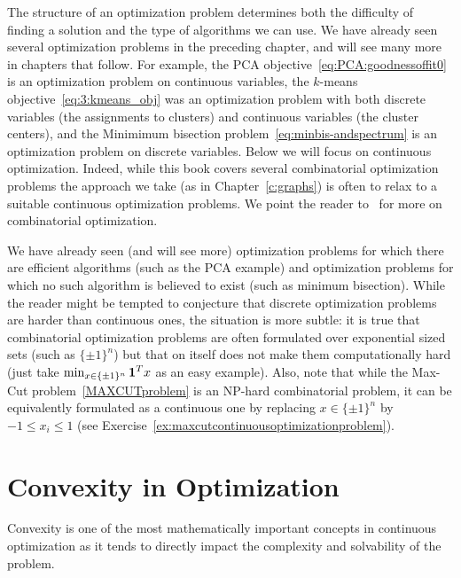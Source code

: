 The structure of an optimization problem determines both the difficulty of finding a solution and the type of algorithms we can use. We have already seen several optimization problems in the preceding chapter, and will see many more in chapters that follow. For example, the PCA objective~\eqref{eq:PCA:goodnessoffit0} is an optimization problem on continuous variables, the $k$-means objective~\eqref{eq:3:kmeans_obj} was an optimization problem with both discrete variables (the assignments to clusters) and continuous variables (the cluster centers), and the Minimimum bisection problem~\eqref{eq:minbis-andspectrum} is an optimization problem on discrete variables. Below we will focus on continuous optimization. Indeed, while this book covers several combinatorial optimization problems the approach we take (as in Chapter~\ref{c:graphs}) is often to relax to a suitable continuous optimization problems. We point the reader to~\cite{wolsey1999integer,schrijver2003combinatorial} for more on combinatorial optimization.

We have already seen (and will see more) optimization problems for which there are efficient algorithms (such as the PCA example) and optimization problems for which no such algorithm is believed to exist (such as minimum bisection). While the reader might be tempted to conjecture that discrete optimization problems are harder than continuous ones, the situation is more subtle: it is true that combinatorial optimization problems are often formulated over exponential sized sets (such as $\{\pm1\}^n$) but that on itself does not make them computationally hard (just take $\min_{x\in\{\pm1\}^n} \mathbf{1}^Tx$ as an easy example). Also, note that while the Max-Cut problem~\eqref{MAXCUTproblem} is an NP-hard combinatorial problem, it can be equivalently formulated as a continuous one by replacing $x\in\{\pm1\}^n$ by $-1\leq x_i\leq 1$ (see Exercise~\ref{ex:maxcutcontinuousoptimizationproblem}).







\section{Convexity in Optimization}




Convexity is one of the most mathematically important concepts in continuous optimization as it tends to directly impact the complexity and solvability of the problem.

